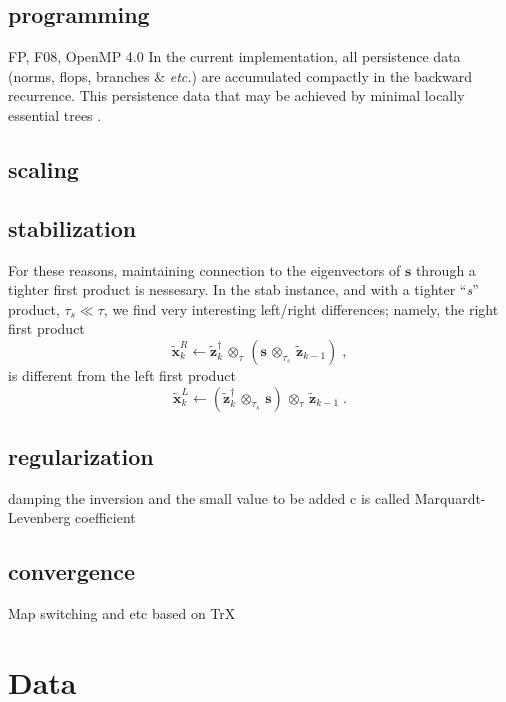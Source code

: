 \documentclass[letterpaper,twocolumn,amsmath,amsfont,amssymb,english,aps,jcp,preprintnumbers,groupaddress,nofootinbib,tightenlines,floatfix]{revtex4}
\newcommand{\mat}[1]{\boldsymbol{#1}}
\newcommand{\ot}{  {\scriptstyle \otimes}_{ \tau } }
\newcommand{\ots}{ {\scriptstyle \otimes}_{ \! \tau_s } }
\theoremstyle{plain}
\theoremstyle{remark}
\theoremstyle{plain}
\begin{document}
\subsection{programming}

FP, F08, OpenMP 4.0
In the current implementation, all persistence data
(norms, flops, branches \& {\em etc.}) are accumulated compactly in the backward recurrence.  This persistence data
 that may be achieved by minimal locally essential trees \cite{}.

\subsection{scaling}

\subsection{stabilization}

For these reasons, maintaining connection to the eigenvectors of $\mat{s}$ through 
a tighter first product is nessesary.  In the stab instance, and with a 
tighter ``{\em s}'' product, $\tau_s \ll \tau$, we find very interesting left/right differences; 
namely, the right first product 
\begin{equation} 
\widetilde{\mat{x}}^R_k \leftarrow \widetilde{\mat{z}}^\dagger_{k} \, \ot  \, \left( \mat{s} \,  \ots \, \widetilde{\mat{z}}_{k-1}  \right) \; ,
\end{equation}
is  different from the left first product 
\begin{equation} 
\widetilde{\mat{x}}^L_k \leftarrow \left(  \widetilde{\mat{z}}^\dagger_{k} \, \ots \, \mat{s} \right) \,  \ot  \, \widetilde{\mat{z}}_{k-1} \; .
\end{equation}

\subsection{regularization}
damping the inversion and the small value to be added c is called Marquardt-Levenberg coefficient

\subsection{convergence}

Map switching and etc based on TrX

\section{Data} \label{data}
\end{document}
